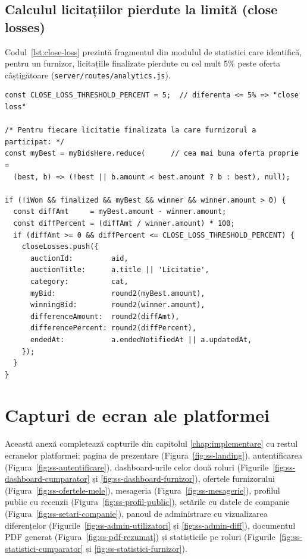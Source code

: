 \begin{appendices}
\section{Calculul licitațiilor pierdute la limită (close losses)}

Codul~\ref{lst:close-loss} prezintă fragmentul din modulul de statistici care identifică, pentru un furnizor, licitațiile finalizate pierdute cu cel mult 5\% peste oferta câștigătoare (\texttt{server/routes/analytics.js}).

\begin{lstlisting}[caption={Identificarea licitațiilor pierdute la limită},label={lst:close-loss}]
const CLOSE_LOSS_THRESHOLD_PERCENT = 5;  // diferenta <= 5% => "close loss"

/* Pentru fiecare licitatie finalizata la care furnizorul a participat: */
const myBest = myBidsHere.reduce(      // cea mai buna oferta proprie =
  (best, b) => (!best || b.amount < best.amount ? b : best), null);

if (!iWon && finalized && myBest && winner && winner.amount > 0) {
  const diffAmt     = myBest.amount - winner.amount;
  const diffPercent = (diffAmt / winner.amount) * 100;
  if (diffAmt >= 0 && diffPercent <= CLOSE_LOSS_THRESHOLD_PERCENT) {
    closeLosses.push({
      auctionId:         aid,
      auctionTitle:      a.title || 'Licitatie',
      category:          cat,
      myBid:             round2(myBest.amount),
      winningBid:        round2(winner.amount),
      differenceAmount:  round2(diffAmt),
      differencePercent: round2(diffPercent),
      endedAt:           a.endedNotifiedAt || a.updatedAt,
    });
  }
}
\end{lstlisting}

\chapter{Capturi de ecran ale platformei}
\label{anexa:screenshots}

Această anexă completează capturile din capitolul \ref{chap:implementare} cu restul ecranelor platformei: pagina de prezentare (Figura~\ref{fig:ss-landing}), autentificarea (Figura~\ref{fig:ss-autentificare}), dashboard-urile celor două roluri (Figurile~\ref{fig:ss-dashboard-cumparator} și \ref{fig:ss-dashboard-furnizor}), ofertele furnizorului (Figura~\ref{fig:ss-ofertele-mele}), mesageria (Figura~\ref{fig:ss-mesagerie}), profilul public cu recenzii (Figura~\ref{fig:ss-profil-public}), setările cu datele de companie (Figura~\ref{fig:ss-setari-companie}), panoul de administrare cu vizualizarea diferențelor (Figurile~\ref{fig:ss-admin-utilizatori} și \ref{fig:ss-admin-diff}), documentul PDF generat (Figura~\ref{fig:ss-pdf-rezumat}) și statisticile pe roluri (Figurile~\ref{fig:ss-statistici-cumparator} și \ref{fig:ss-statistici-furnizor}).


\end{appendices}
